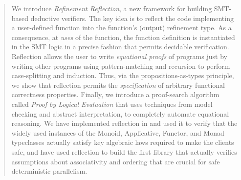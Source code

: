 \begin{abstract}
We introduce \emph{Refinement Reflection},
a new framework for building SMT-based
deductive verifiers.
%
The key idea is to reflect the code
implementing a user-defined function
into the function's (output) refinement
type.
As a consequence, at \emph{uses} of
the function, the function definition
is instantiated in the SMT logic in a precise fashion
that permits decidable verification.
%
Reflection allows the user to write 
\emph{equational proofs} of programs 
just by writing other programs 
\eg using pattern-matching
and recursion to perform case-splitting
and induction.
Thus, via the propositions-as-types principle,
we show that reflection permits the
\emph{specification} of arbitrary
functional correctness properties.
%
Finally, we introduce a proof-search algorithm called
\emph{Proof by Logical Evaluation}
that uses techniques from model
checking and abstract interpretation,
to completely automate equational
reasoning.
%
We have implemented reflection in
\toolname and used it to verify that
the widely used instances of the Monoid,
Applicative, Functor, and Monad typeclasses
actually satisfy key algebraic laws
required to make the clients safe, 
and have used reflection to build the first 
library that actually verifies assumptions 
about associativity and ordering that are 
crucial for safe deterministic parallelism.
\end{abstract}